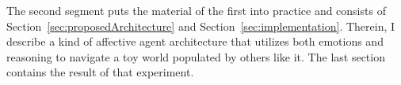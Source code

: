 The second segment puts the material of the first into practice and consists of Section~\ref{sec:proposedArchitecture} and Section~\ref{sec:implementation}. Therein, I describe a kind of affective agent architecture that utilizes both emotions and reasoning to navigate a toy world populated by others like it. The last section contains the result of that experiment.




